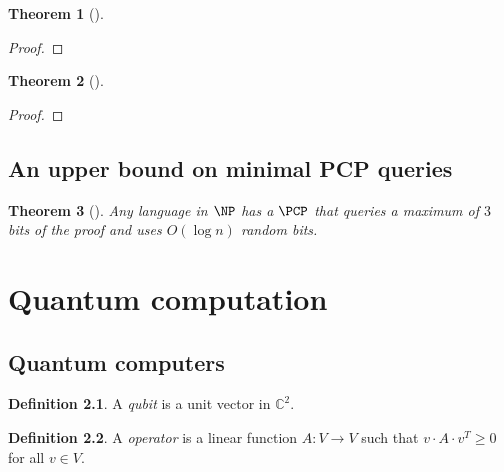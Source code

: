 \documentclass[english,12pt]{reedthesis}
\theoremstyle{plain}
\newtheorem{thm}{Theorem}[section]
\theoremstyle{definition}
\newtheorem{defn}[defn]{Definition}
\theoremstyle{remark}
\begin{document}

\begin{thm}[{\cite[Theorem 2.1.9]{ALMSS98}}]\label{thm:always-robust-pcpp}
\end{thm}

\begin{proof}
\end{proof}

\begin{thm}[{\cite[Prop.\ 2.14]{BGHSV06}}]\label{thm:parallel-vs-robust}
\end{thm}

\begin{proof}
\end{proof}

\section{An upper bound on minimal PCP queries}\label{sec:pcp-query-complexity}

\begin{thm}[{\cite{Has97}}]\label{thm:pcp-max-queries}
  Any language in $\NP$ has a $\PCP$ that queries a maximum of $3$ bits of the
  proof and uses $O(\log n)$ random bits.
\end{thm}

\chapter{Quantum computation}\label{chap:quantum}

\section{Quantum computers}\label{sec:quant-comp}

\begin{defn}\label{def:qubit}
  A \emph{qubit} is a unit vector in $\mathbb{C}^{2}$.
\end{defn}

\begin{defn}\label{def:operator}
  A \emph{operator} is a linear function $A\colon V \rightarrow V$ such that
  $v \cdot A \cdot v^{T} \ge 0$ for all $v \in V$.
\end{defn}
\end{document}
